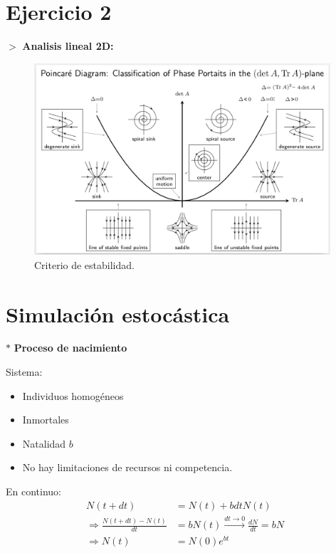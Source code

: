 \documentclass[%
 reprint,
 amsmath,amssymb,
 aps,
]{revtex4-1}
\begin{document}
\section{Ejercicio 2}

$>$ \textbf{Analisis lineal 2D:}

\begin{figure}[ht!]
  \includegraphics[width = 0.98\textwidth]{Stability_Diagram.png}
  \caption{\label{fig:figura1} Criterio de estabilidad.}
\end{figure} 

\section{Simulación estocástica}

$*$ \textbf{Proceso de nacimiento}

Sistema:
\begin{itemize}
  \item Individuos homogéneos
  \item Inmortales
  \item Natalidad $b$
  \item No hay limitaciones de recursos ni competencia. 
\end{itemize}

En continuo:
$$
\begin{aligned}
  N(t+d t) &= N(t)+b d t N(t) \\
  \Rightarrow \frac{N(t+d t)-N(t)}{d t} &= b N(t) \stackrel{d t \rightarrow 0}{\longrightarrow} \frac{d N}{d t}=b N \\
  \Rightarrow N(t) &= N(0) e^{b t}
\end{aligned}
$$

\end{document}
